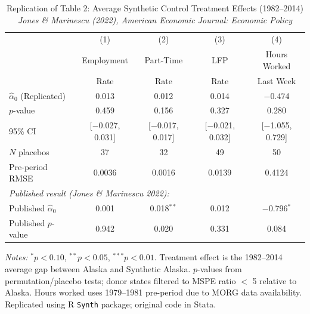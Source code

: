 \begin{table}[h]
\centering
\caption{Replication of Table 2: Average Synthetic Control Treatment Effects (1982--2014)\\
\small{\textit{Jones \& Marinescu (2022), American Economic Journal: Economic Policy}}}
\label{tab:table2}
\begin{tabular}{lcccc}
\toprule
 & (1) & (2) & (3) & (4) \\
 & Employment & Part-Time & LFP & Hours Worked \\
 & Rate & Rate & Rate & Last Week \\
\midrule
$\hat{\alpha}_0$ (Replicated) & 0.013 & 0.012 & 0.014 & $-$0.474 \\
$p$-value                      & 0.459 & 0.156 & 0.327 & 0.280 \\
95\% CI                        & [$-$0.027, 0.031] & [$-$0.017, 0.017] & [$-$0.021, 0.032] & [$-$1.055, 0.729] \\
$N$ placebos                   & 37 & 32 & 49 & 50 \\
Pre-period RMSE                & 0.0036 & 0.0016 & 0.0139 & 0.4124 \\
\midrule
\multicolumn{5}{l}{\textit{Published result (Jones \& Marinescu 2022):}} \\
Published $\hat{\alpha}_0$     & 0.001 & 0.018$^{**}$ & 0.012 & $-$0.796$^{*}$ \\
Published $p$-value            & 0.942 & 0.020 & 0.331 & 0.084 \\
\bottomrule
\end{tabular}
\begin{flushleft}
\small \textit{Notes:} $^{*}p<0.10$, $^{**}p<0.05$, $^{***}p<0.01$.
Treatment effect is the 1982--2014 average gap between Alaska and Synthetic Alaska.
$p$-values from permutation/placebo tests; donor states filtered to MSPE ratio $<$ 5 relative to Alaska.
Hours worked uses 1979--1981 pre-period due to MORG data availability.
Replicated using R \texttt{Synth} package; original code in Stata.
\end{flushleft}
\end{table}
